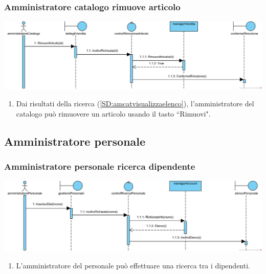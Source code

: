 \documentclass[12pt,a4paper]{article}
\begin{document}
\subsubsection{Amministratore catalogo rimuove articolo}
\label{SD:amcatrimuovearticolo}
\begin{center}
\includegraphics[width=\textwidth]{SequenceDiagram/AmministratoreCatalogoVenditaRimuove}
\end{center}

\begin{enumerate}
\item Dai risultati della ricerca (\ref{SD:amcatvisualizzaelenco}), l'amministratore del catalogo può rimuovere un articolo usando il tasto ``Rimuovi".
\end{enumerate}

\newpage

\subsection{Amministratore personale}
\subsubsection{Amministratore personale ricerca dipendente}
\label{SD:amperricerca}
\begin{center}
\includegraphics[width=\textwidth]{SequenceDiagram/AmministratorePersonaleDipendenteRicerca}
\end{center}

\begin{enumerate}
\item L'amministratore del personale può effettuare una ricerca tra i dipendenti.
\end{enumerate}
\end{document}
